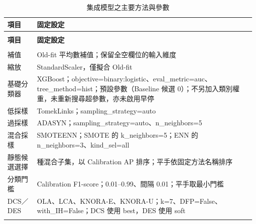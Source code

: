 \begingroup
\footnotesize
{}
\setlength{\tabcolsep}{4pt}
\renewcommand{\arraystretch}{1.25}
\setlength{\LTleft}{0pt plus 1fill}
\setlength{\LTright}{0pt plus 1fill}
\begin{longtable}{@{}>{\raggedright\arraybackslash}p{}>{\raggedright\arraybackslash}p{}@{}}
\caption{集成模型之主要方法與參數}\label{tab:method-parameters}\\
\toprule
\textbf{項目} & \textbf{固定設定} \\
\midrule
\endfirsthead
\multicolumn{2}{c}{表~\thetable（續）}\\
\toprule
\textbf{項目} & \textbf{固定設定} \\
\midrule
\endhead
\midrule
\multicolumn{2}{r}{續下頁}\\
\endfoot
\bottomrule
\endlastfoot
補值 & Old-fit 平均數補值；保留全空欄位的輸入維度 \\
\addlinespace[2pt]
縮放 & StandardScaler，僅擬合 Old-fit \\
\addlinespace[2pt]
基礎分類器 & XGBoost；{\normalfont objective=\allowbreak{}binary:logistic}、{\normalfont eval\_\allowbreak{}metric=\allowbreak{}auc}、{\normalfont tree\_\allowbreak{}method=\allowbreak{}hist}；預設參數（Baseline 候選 0）；不另加入類別權重，未重新搜尋超參數，亦未啟用早停 \\
\addlinespace[2pt]
低採樣 & TomekLinks；{\normalfont sampling\_\allowbreak{}strategy=\allowbreak{}auto} \\
\addlinespace[2pt]
過採樣 & ADASYN；{\normalfont sampling\_\allowbreak{}strategy=\allowbreak{}auto}、{\normalfont n\_\allowbreak{}neighbors=\allowbreak{}5} \\
\addlinespace[2pt]
混合採樣 & SMOTEENN；SMOTE 的 {\normalfont k\_\allowbreak{}neighbors=\allowbreak{}5}；ENN 的 {\normalfont n\_\allowbreak{}neighbors=\allowbreak{}3}、{\normalfont kind\_\allowbreak{}sel=\allowbreak{}all} \\
\addlinespace[2pt]
靜態候選選擇 & 49 種混合子集，以 Calibration AP 排序；平手依固定方法名稱排序 \\
\addlinespace[2pt]
分類門檻 & Calibration F1-score；0.01–0.99、間隔 0.01；平手取最小門檻 \\
\addlinespace[2pt]
DCS／DES & OLA、LCA、KNORA-E、KNORA-U；{\normalfont k=\allowbreak{}7}、{\normalfont DFP=\allowbreak{}False}、{\normalfont with\_\allowbreak{}IH=\allowbreak{}False}；DCS 使用 {\normalfont best}，DES 使用 {\normalfont soft} \\*
\end{longtable}
\endgroup

